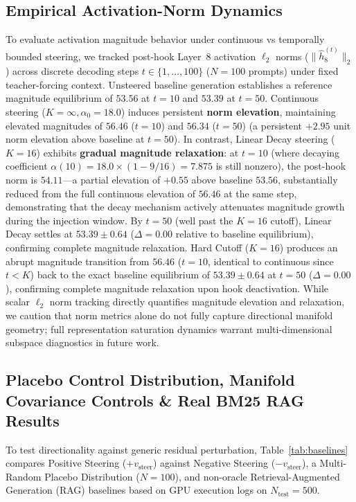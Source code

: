 \documentclass[conference]{IEEEtran}
\begin{document}
\subsection{Empirical Activation-Norm Dynamics}
To evaluate activation magnitude behavior under continuous vs temporally bounded steering, we tracked post-hook Layer~8 activation $\ell_2$ norms ($\|\hat{h}_8^{(t)}\|_2$) across discrete decoding steps $t \in \{1, \ldots, 100\}$ ($N=100$ prompts) under fixed teacher-forcing context. Unsteered baseline generation establishes a reference magnitude equilibrium of $53.56$ at $t=10$ and $53.39$ at $t=50$. Continuous steering ($K=\infty, \alpha_0=18.0$) induces persistent \textbf{norm elevation}, maintaining elevated magnitudes of $56.46$ ($t=10$) and $56.34$ ($t=50$) (a persistent $+2.95$ unit norm elevation above baseline at $t=50$). In contrast, Linear Decay steering ($K=16$) exhibits \textbf{gradual magnitude relaxation}: at $t=10$ (where decaying coefficient $\alpha(10) = 18.0 \times (1 - 9/16) = 7.875$ is still nonzero), the post-hook norm is $54.11$---a partial elevation of $+0.55$ above baseline $53.56$, substantially reduced from the full continuous elevation of $56.46$ at the same step, demonstrating that the decay mechanism actively attenuates magnitude growth during the injection window. By $t=50$ (well past the $K=16$ cutoff), Linear Decay settles at $53.39 \pm 0.64$ ($\Delta = 0.00$ relative to baseline equilibrium), confirming complete magnitude relaxation. Hard Cutoff ($K=16$) produces an abrupt magnitude transition from $56.46$ ($t=10$, identical to continuous since $t < K$) back to the exact baseline equilibrium of $53.39 \pm 0.64$ at $t=50$ ($\Delta = 0.00$), confirming complete magnitude relaxation upon hook deactivation. While scalar $\ell_2$ norm tracking directly quantifies magnitude elevation and relaxation, we caution that norm metrics alone do not fully capture directional manifold geometry; full representation saturation dynamics warrant multi-dimensional subspace diagnostics in future work.

\subsection{Placebo Control Distribution, Manifold Covariance Controls \& Real BM25 RAG Results}
To test directionality against generic residual perturbation, Table~\ref{tab:baselines} compares Positive Steering ($+v_{\text{steer}}$) against Negative Steering ($-v_{\text{steer}}$), a Multi-Random Placebo Distribution ($N=100$), and non-oracle Retrieval-Augmented Generation (RAG) baselines based on GPU execution logs on $N_{\text{test}}=500$.
\end{document}
